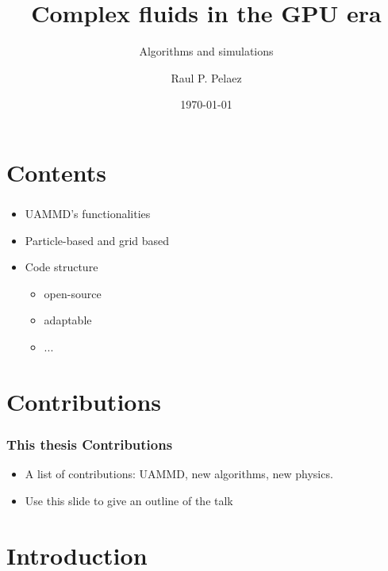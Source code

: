 \documentclass{beamer}
\title{Complex fluids in the GPU era}
\subtitle{Algorithms and simulations}
\author{Raul P. Pelaez}
\institute{Universidad Autónoma de Madrid}
\date{\today}
\begin{document}
\begin{frame}
  \titlepage
\end{frame}

\begin{frame}
  \tableofcontents
\end{frame}




\section{Contents}
\begin{frame}
  \frametitle{\insertsection}
  \begin{itemize}
  \item UAMMD's functionalities
  \item Particle-based and grid based
  \item Code structure
    \begin{itemize}
    \item open-source
    \item adaptable
    \item ...
    \end{itemize}
  \end{itemize}
\end{frame}
\section{Contributions}
\begin{frame}
  \frametitle{This thesis Contributions}
  \begin{itemize}
  \item A list of contributions: UAMMD, new algorithms, new physics.
  \item Use this slide to give an outline of the talk
  \end{itemize}
\end{frame}
\section{Introduction}
\end{document}
